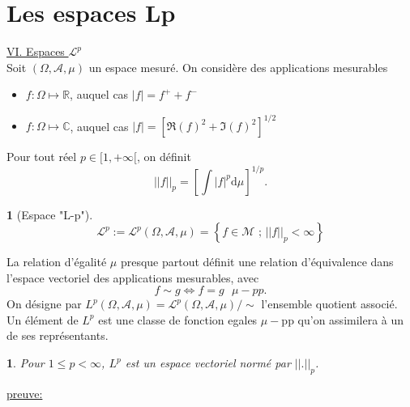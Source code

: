 \documentclass[8pt,notheorems]{beamer}
\newtheorem{theorem}{\translate{Theorem}}[section]
\newtheorem{theorem}{\translate{Theoreme}}
\theoremstyle{definition}
\newtheorem{definition}{\translate{Definition}}
\theoremstyle{example}
\theoremstyle{mystyle}
\theoremstyle{plain}
\begin{document}
\section{Les espaces Lp}
\begin{frame}[allowframebreaks]
\underline{VI. Espaces $\mathcal{L}^p$}\\
Soit $(\Omega,\mathcal{A},\mu)$ un espace mesuré. On considère des applications mesurables  
\begin{itemize}
\item $f:\Omega\mapsto \mathbb{R}$, auquel cas $|f|=f^+ + f^-$
\item $f:\Omega\mapsto \mathbb{C}$, auquel cas $|f| = \left[\Re(f)^2+\Im(f)^2\right]^{1/2}$
\end{itemize}
Pour tout réel $p\in[1,+\infty[$, on définit
$$
||f||_p = \left[\int|f|^p\text{d}\mu\right]^{1/p}.
$$
\begin{definition}[Espace "L-p"]
$$
\mathcal{L}^p:=\mathcal{L}^p(\Omega,\mathcal{A},\mu) = \left\{f \in\mathcal{M}\text{ ; }||f||_p<\infty\right\}
$$
\end{definition}
La relation d'égalité $\mu$ presque partout définit une relation d'équivalence dans l'espace vectoriel des applications mesurables, avec 
$$
f\sim g\Leftrightarrow f=g\text{ }\mu-pp.
$$
On désigne par $L^p(\Omega,\mathcal{A},\mu) = \mathcal{L}^p(\Omega,\mathcal{A},\mu)/ \sim$ l'ensemble quotient associé. Un élément de $L^p$ est une classe de fonction egales $\mu-$pp qu'on assimilera à un de ses représentants. 
\begin{theorem}
Pour $1\leq p<\infty$, $L^p$ est un espace vectoriel normé par $||.||_p$.
\end{theorem} 
\underline{preuve:}


\end{frame}
\end{document}
